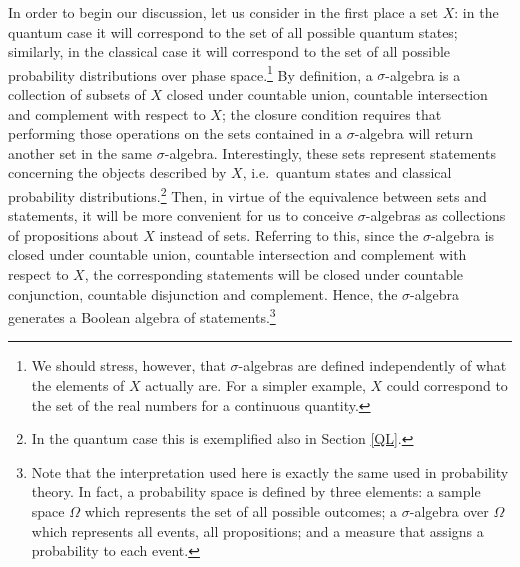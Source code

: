\documentclass[11pt, executivepaper]{article}
\begin{document}
In order to begin our discussion, let us consider in the first place a set $X$: in the quantum case it will correspond to the set of all possible quantum states; similarly, in the classical case it will correspond to the set of all possible probability distributions over phase space.\footnote{We should stress, however, that $\sigma$-algebras are defined independently of what the elements of $X$ actually are. For a simpler example, $X$  could correspond to the set of the real numbers for a continuous quantity.} By definition, a $\sigma$-algebra is a collection of subsets of $X$ closed under countable union, countable intersection and complement with respect to $X$; the closure condition requires that  performing those operations on the sets contained in a $\sigma$-algebra will return another set in the same $\sigma$-algebra. Interestingly, these sets represent statements concerning the objects described by $X$, i.e.\ quantum states and classical probability distributions.\footnote{In the quantum case this is exemplified also in Section \ref{QL}.} Then, in virtue of the equivalence between sets and statements, it will be more convenient for us to conceive $\sigma$-algebras as collections of propositions about $X$ instead of sets. Referring to this, since the $\sigma$-algebra is closed under countable union, countable intersection and complement with respect to $X$, the corresponding statements will be closed under countable conjunction, countable disjunction and complement. Hence, the $\sigma$-algebra generates a Boolean algebra of statements.\footnote{Note that the interpretation used here is exactly the same used in probability theory. In fact, a probability space is defined by three elements: a sample space $\Omega$ which represents the set of all possible outcomes; a $\sigma$-algebra over $\Omega$ which represents all events, all propositions; and a measure that assigns a probability to each event.} 
\end{document}
